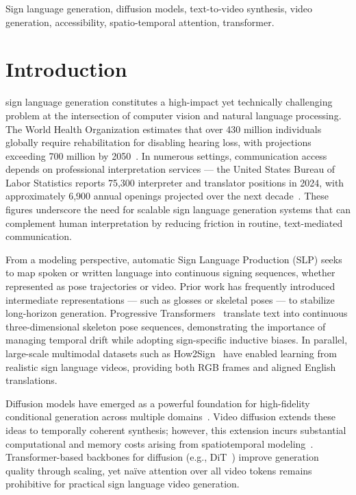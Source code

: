 \documentclass{ieeeaccess}
\begin{document}
\begin{keywords}
Sign language generation, diffusion models, text-to-video synthesis, video generation, accessibility, spatio-temporal attention, transformer.
\end{keywords}

\titlepgskip=-21pt

\maketitle

\section{Introduction}
\label{sec:introduction}

{\color{blue}%
 sign language generation constitutes a high-impact yet technically challenging problem at the intersection of computer vision and natural language processing. The World Health Organization estimates that over 430 million individuals globally require rehabilitation for disabling hearing loss, with projections exceeding 700 million by 2050~\cite{who2025deafness}. In numerous settings, communication access depends on professional interpretation services — the United States Bureau of Labor Statistics reports 75,300 interpreter and translator positions in 2024, with approximately 6,900 annual openings projected over the next decade~\cite{bls2025interpreters}. These figures underscore the need for scalable sign language generation systems that can complement human interpretation by reducing friction in routine, text-mediated communication.
}

{\color{blue}%
From a modeling perspective, automatic Sign Language Production (SLP) seeks to map spoken or written language into continuous signing sequences, whether represented as pose trajectories or video. Prior work has frequently introduced intermediate representations — such as glosses or skeletal poses — to stabilize long-horizon generation. Progressive Transformers~\cite{saunders2020progressive} translate text into continuous three-dimensional skeleton pose sequences, demonstrating the importance of managing temporal drift while adopting sign-specific inductive biases. In parallel, large-scale multimodal datasets such as How2Sign~\cite{duarte2021how2sign} have enabled learning from realistic sign language videos, providing both RGB frames and aligned English translations.
}

Diffusion models have emerged as a powerful foundation for high-fidelity conditional generation across multiple domains~\cite{ho2020ddpm, rombach2022ldm}. Video diffusion extends these ideas to temporally coherent synthesis; however, this extension incurs substantial computational and memory costs arising from spatiotemporal modeling~\cite{ho2022videodiffusion}. Transformer-based backbones for diffusion (e.g., DiT~\cite{peebles2023dit}) improve generation quality through scaling, yet na\"{i}ve attention over all video tokens remains prohibitive for practical sign language video generation.
\end{document}
